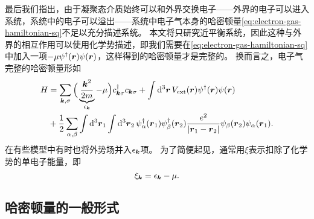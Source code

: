 最后我们指出，由于凝聚态介质始终可以和外界交换电子——外界的电子可以进入系统，系统中的电子可以溢出——系统中电子气本身的哈密顿量\eqref{eq:electron-gas-hamiltonian-sq}不足以充分描述系统。
本文将只研究近平衡系统，因此这种与外界的相互作用可以使用化学势描述，即我们需要在\eqref{eq:electron-gas-hamiltonian-sq}中加入一项$-\mu {\psi}^\dagger(\vb*{r}) {\psi}(\vb*{r})$，这样得到的哈密顿量才是完整的。
换而言之，电子气完整的哈密顿量形如
\begin{equation}
    \begin{aligned}
        {H} &= \sum_{\vb*{k}, \sigma} \Big( \underbrace{\frac{\vb*{k}^2}{2m}}_{\epsilon_{\vb*{k}}} - \mu \Big) {c}^\dagger_{\vb*{k} \sigma} {c}_{\vb*{k} \sigma} 
        + \int \dd[3]{\vb*{r}} V_\text{ext}(\vb*{r}) {\psi}^\dagger(\vb*{r}) {\psi}(\vb*{r}) \\ 
        &+ \frac{1}{2} \sum_{\alpha, \beta} \int \dd[3]{\vb*{r}_1} \int \dd[3]{\vb*{r}_2} 
        {\psi}_\alpha^\dagger (\vb*{r}_1) {\psi}_\beta^\dagger (\vb*{r}_2) \frac{e^2}{\abs{\vb*{r}_1 - \vb*{r}_2}} {\psi}_\beta (\vb*{r}_2) {\psi}_\alpha (\vb*{r}_1).
    \end{aligned}
    \label{eq:full-electron-gas-hamiltonian}
\end{equation}
在有些模型中有时也将外势场并入$\epsilon_{\vb*{k}}$项。
为了简便起见，通常用$\xi$表示扣除了化学势的单电子能量，即
\begin{equation}
    \xi_{\vb*{k}} = \epsilon_{\vb*{k}} - \mu.
\end{equation}

\subsection{哈密顿量的一般形式}

